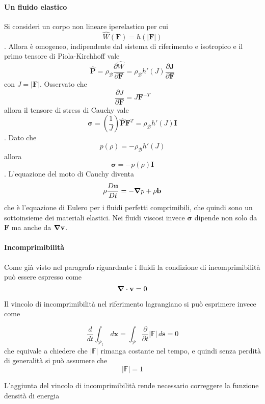 \paragraph{Un fluido elastico}
Si consideri un corpo non lineare iperelastico per cui
$$\widehat{W}(\mathbf{F}) = h(|\mathbf{F}|)$$.
Allora è omogeneo, indipendente dal sistema di riferimento e isotropico e il primo tensore di Piola-Kirchhoff vale
$$\widehat{\mathbf{P}}=\rho_{\mathcal{B}}\frac{\partial \widehat{W}}{\partial \mathbf{F}} = \rho_{\mathcal{B}}h'(J)\frac{\partial \mathbf{J}}{\partial \mathbf{F}}$$
con $J = |\mathbf{F}|$.
Osservato che 
$$\frac{\partial J}{\partial \mathbf{F}} = J\mathbf{F}^{-T}$$
allora il tensore di stress di Cauchy vale
$$\boldsymbol{\sigma}=(\frac{1}{J})\widehat{\mathbf{P}}\mathbf{F}^{T}=\rho_{\mathcal{B}}h'(J)\mathbf{I}$$.
Dato che
$$p(\rho)=-\rho_{\mathcal{B}}h'(J)$$
allora
$$\boldsymbol{\sigma}=-p(\rho)\mathbf{I}$$.
L'equazione del moto di Cauchy diventa
$$\rho\frac{D \mathbf{u}}{Dt} = -\boldsymbol{\nabla} p+\rho\mathbf{b}$$
che è l'equazione di Eulero per i fluidi perfetti comprimibili, che quindi sono un sottoinsieme dei materiali elastici.
Nei fluidi viscosi invece $\boldsymbol{\sigma}$ dipende non solo da $\mathbf{F}$ ma anche da $\boldsymbol{\nabla}\mathbf{v}$.

\paragraph{Incomprimibilità}

Come già visto nel paragrafo riguardante i fluidi la condizione di incomprimibilità può essere espresso come 
\begin{equation*}
\Nabla\cdot\mathbf{v}=0 %
\end{equation*}

Il vincolo di incomprimibilità nel riferimento lagrangiano si può esprimere invece come

\begin{equation*}
\frac{d}{dt}\int_{\mathcal{P}_t}\,d\mathbf{x} = \int_{\mathcal{P}}\frac{\partial}{\partial t}\vert\mathbb{F}\vert\,d\mathbf{s} = 0
\end{equation*}
che equivale a chiedere che $\vert\mathbb{F}\vert$ rimanga costante nel tempo, e quindi senza perdità di generalità si può assumere che 
\begin{equation*}
\vert \mathbb{F} \vert = 1
\end{equation*}

L'aggiunta del vincolo di incomprimibilità rende necessario correggere la funzione densità di energia

